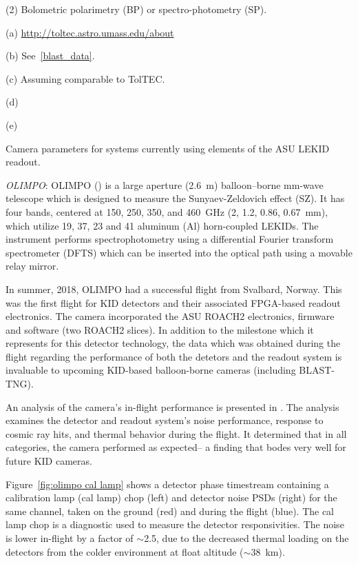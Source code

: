 {\begin{table}
\begin{threeparttable}
\begin{tablenotes}
\item (2) Bolometric polarimetry (BP) or spectro-photometry (SP).
\item (a) \url{http://toltec.astro.umass.edu/about}
\item (b) See~\ref{blast_data}.
\item (c) Assuming comparable to TolTEC.
\item (d) \citet{paiella2019kinetic}
\item (e) \citet{mcgeehan2018low}
\end{tablenotes}
\caption{Camera parameters for systems currently using elements of the ASU LEKID readout.}
\label{tab:cameras}
\end{threeparttable}
\end{table}

\vspace{5mm}

\textit{OLIMPO}: OLIMPO (\citet{masi2008olimpo,paiella2019kinetic}) is a large aperture (2.6~m) balloon–borne mm-wave telescope which is designed to measure the Sunyaev-Zeldovich effect (SZ). It has four bands, centered at 150, 250, 350, and 460~GHz (2, 1.2, 0.86, 0.67~mm), which utilize 19, 37, 23 and 41 aluminum (Al) horn-coupled LEKIDs. The instrument performs spectrophotometry using a differential Fourier transform spectrometer (DFTS) which can be inserted into the optical path using a movable relay mirror.

In summer, 2018, OLIMPO had a successful flight from Svalbard, Norway. This was the first flight for KID detectors and their associated FPGA-based readout electronics. The camera incorporated the ASU ROACH2 electronics, firmware and software (two ROACH2 slices). In addition to the milestone which it represents for this detector technology, the data which was obtained during the flight regarding the performance of both the detetors and the readout system is invaluable to upcoming KID-based balloon-borne cameras (including BLAST-TNG).

An analysis of the camera's in-flight performance is presented in \citet{masi2019kinetic}. The analysis examines the detector and readout system's noise performance, response to cosmic ray hits, and thermal behavior during the flight. It determined that in all categories, the camera performed as expected-- a finding that bodes very well for future KID cameras.

Figure~\ref{fig:olimpo cal lamp} \cite{masi2019kinetic} shows a detector phase timestream containing a calibration lamp (cal lamp) chop (left) and detector noise PSDs (right) for the same channel, taken on the ground (red) and during the flight (blue). The cal lamp chop is a diagnostic used to measure the detector responsivities. The noise is lower in-flight by a factor of $\sim$2.5, due to the decreased thermal loading on the detectors from the colder environment at float altitude ($\sim$38~km).

}
